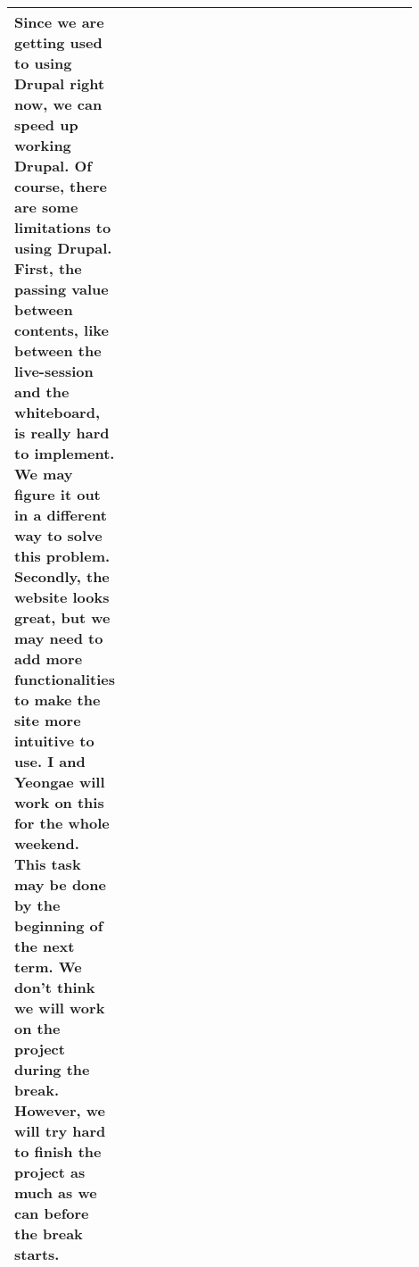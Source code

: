 \documentclass[10pt]{article}
\begin{document}
\begin{center}
\begin{tabular}{ | p{0.1\linewidth} | p{0.8\linewidth} | }
            Since we are getting used to using Drupal right now, we can speed up working Drupal.
            Of course, there are some limitations to using Drupal.
            First, the passing value between contents, like between the live-session and the whiteboard, is really hard to implement.
            We may figure it out in a different way to solve this problem. 
            Secondly, the website looks great, but we may need to add more functionalities to make the site more intuitive to use.
            I and Yeongae will work on this for the whole weekend.
            This task may be done by the beginning of the next term.
            We don't think we will work on the project during the break.
            However, we will try hard to finish the project as much as we can before the break starts.  \\ \hline
        \end{tabular}
        \end{center}
                
\end{document}

